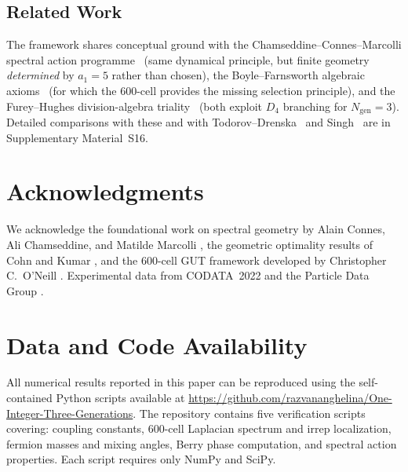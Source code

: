 \documentclass[12pt,a4paper]{article}
\theoremstyle{definition}
\begin{document}
\subsection{Related Work}

The framework shares conceptual ground with the Chamseddine--Connes--Marcolli spectral action programme~\cite{chamseddine1997,ccm2007} (same dynamical principle, but finite geometry \emph{determined} by $a_1 = 5$ rather than chosen), the Boyle--Farnsworth algebraic axioms~\cite{boyle2020} (for which the 600-cell provides the missing selection principle), and the Furey--Hughes division-algebra triality~\cite{furey2024} (both exploit $D_4$ branching for $N_{\text{gen}} = 3$).  Detailed comparisons with these and with Todorov--Drenska~\cite{todorov2020} and Singh~\cite{singh2025} are in Supplementary Material~S16.

\section*{Acknowledgments}

We acknowledge the foundational work on spectral geometry by Alain Connes, Ali Chamseddine, and Matilde Marcolli \cite{chamseddine1997,ccm2007}, the geometric optimality results of Cohn and Kumar \cite{cohn2007,cohn2011}, and the 600-cell GUT framework developed by Christopher C.\ O'Neill \cite{oneill2025gut,oneill2023binary}. Experimental data from CODATA~2022 \cite{codata2022} and the Particle Data Group \cite{pdg2024}.

\section*{Data and Code Availability}

All numerical results reported in this paper can be reproduced using the self-contained Python scripts available at \url{https://github.com/razvananghelina/One-Integer-Three-Generations}. The repository contains five verification scripts covering: coupling constants, 600-cell Laplacian spectrum and irrep localization, fermion masses and mixing angles, Berry phase computation, and spectral action properties. Each script requires only NumPy and SciPy.
\end{document}
